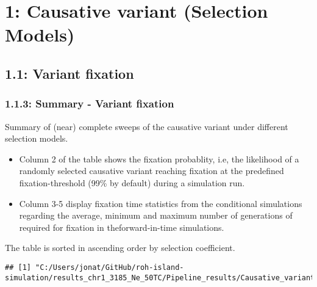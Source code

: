 \documentclass[
]{article}
\begin{document}
\section{1: Causative variant (Selection
Models)}\label{causative-variant-selection-models}

\subsection{1.1: Variant fixation}\label{variant-fixation}

\subsubsection{1.1.3: Summary - Variant
fixation}\label{summary---variant-fixation}

Summary of (near) complete sweeps of the causative variant under
different selection models.

\begin{itemize}
\item
  Column 2 of the table shows the fixation probablity, i.e, the
  likelihood of a randomly selected causative variant reaching fixation
  at the predefined fixation-threshold (99\% by default) during a
  simulation run.
\item
  Column 3-5 display fixation time statistics from the conditional
  simulations regarding the average, minimum and maximum number of
  generations of required for fixation in theforward-in-time
  simulations.
\end{itemize}

The table is sorted in ascending order by selection coefficient.

\begin{verbatim}
## [1] "C:/Users/jonat/GitHub/roh-island-simulation/results_chr1_3185_Ne_50TC/Pipeline_results/Causative_variant_Fixation_summary.txt"
\end{verbatim}
\end{document}
